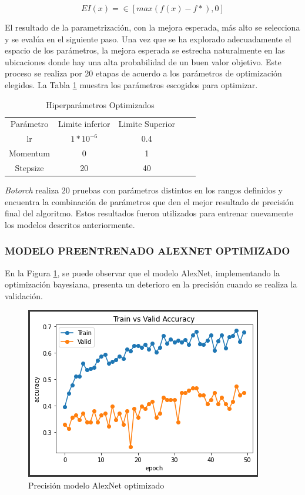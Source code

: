 	\begin{equation}
		{EI(x)=\in[max(f(x)-f*),0]}
		\label{EI}
	\end{equation}
	
	El resultado de la parametrización, con la mejora esperada, más alto se selecciona y se evalúa en el siguiente paso. Una vez que se ha explorado adecuadamente el espacio de los parámetros, la mejora esperada se estrecha naturalmente en las ubicaciones donde hay una alta probabilidad de un buen valor objetivo. Este proceso se realiza por 20 etapas de acuerdo a los parámetros de optimización elegidos. La Tabla \ref{paraopt} muestra los parámetros escogidos para optimizar.
	
	\begin{table}[ht]
		\centering
		\begin{tabular}{|c|c|c|ll}
			\cline{1-3}
			Parámetro & Limite inferior              & Limite Superior &  &  \\ \cline{1-3}
			lr         & $1*10^{-6}$ & 0.4             &  &  \\ \cline{1-3}
			Momentum   & 0                            & 1               &  &  \\ \cline{1-3}
			Stepsize   & 20                           & 40              &  &  \\ \cline{1-3}
		\end{tabular}
		\caption{Hiperparámetros Optimizados}
		\label{paraopt}
	\end{table}

	\textit{Botorch} realiza $20$ pruebas con parámetros distintos en los rangos definidos y encuentra la combinación de parámetros que den el mejor resultado de precisión final del algoritmo. Estos resultados fueron utilizados para entrenar nuevamente los modelos descritos anteriormente. 
	
	
	
	
	\newpage	
	\subsubsection{\MakeUppercase{Modelo preentrenado AlexNet optimizado}}
	En la Figura \ref{fig:preci_Alex_OPT}, se puede observar que el modelo AlexNet, implementando la optimización bayesiana, presenta un deterioro en la precisión cuando se realiza la validación.
		\begin{figure}[ht]
			\centering
			\includegraphics[scale=0.6]{Figs/500.png}
			\caption{Precisión modelo AlexNet optimizado}
			\label{fig:preci_Alex_OPT}
		\end{figure}
	
